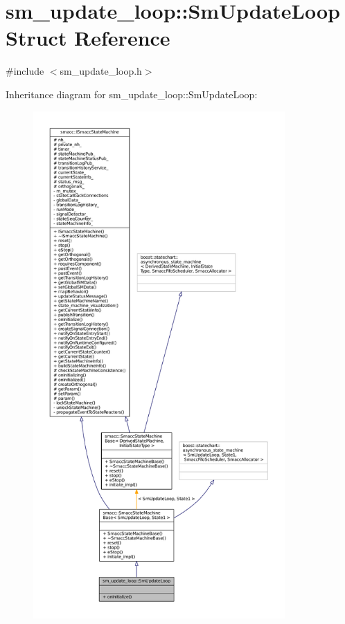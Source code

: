 \hypertarget{structsm__update__loop_1_1SmUpdateLoop}{}\section{sm\+\_\+update\+\_\+loop\+:\+:Sm\+Update\+Loop Struct Reference}
\label{structsm__update__loop_1_1SmUpdateLoop}


{\ttfamily \#include $<$sm\+\_\+update\+\_\+loop.\+h$>$}



Inheritance diagram for sm\+\_\+update\+\_\+loop\+:\+:Sm\+Update\+Loop\+:
\nopagebreak
\begin{figure}[H]
\begin{center}
\leavevmode
\includegraphics[height=550pt]{structsm__update__loop_1_1SmUpdateLoop__inherit__graph}
\end{center}
\end{figure}


